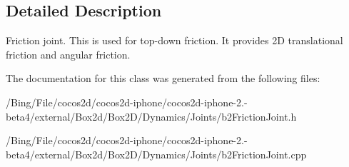 \subsection{Detailed Description}
Friction joint. This is used for top-\/down friction. It provides 2\-D translational friction and angular friction. 

The documentation for this class was generated from the following files\-:\begin{DoxyCompactItemize}
\item 
/\-Bing/\-File/cocos2d/cocos2d-\/iphone/cocos2d-\/iphone-\/2.-\/beta4/external/\-Box2d/\-Box2\-D/\-Dynamics/\-Joints/b2\-Friction\-Joint.\-h\item 
/\-Bing/\-File/cocos2d/cocos2d-\/iphone/cocos2d-\/iphone-\/2.-\/beta4/external/\-Box2d/\-Box2\-D/\-Dynamics/\-Joints/b2\-Friction\-Joint.\-cpp\end{DoxyCompactItemize}
